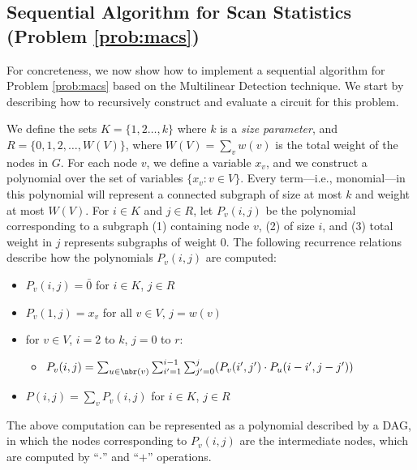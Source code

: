 
\subsection{Sequential Algorithm for Scan Statistics (Problem \ref{prob:macs})}
\label{sec:scan-sequential}

For concreteness, we now show how to implement a sequential algorithm for Problem \ref{prob:macs} based on the Multilinear Detection technique. We start by describing how to recursively construct and evaluate a circuit for this problem.

We define the sets $K=\{1,2 \ldots, k\}$ where $k$ is a \emph{size parameter}, and $R=\{0,1,2, \ldots, W(V)\}$, where $W(V) = \sum_v{w(v)}$ is the total weight of the nodes in $G$. For each node $v$, we define a variable $x_v$, and we construct a polynomial over the set of variables $\{x_v: v \in V\}$. Every term---i.e., monomial---in this polynomial will represent a connected subgraph of size at most $k$ and weight at most $W(V)$.
For $i \in K$ and $j \in R$, let $P_v(i,j)$ be the polynomial corresponding to a subgraph (1) containing node $v$, (2) of size $i$, and (3) total weight in
$j$ represents subgraphs of weight 0.
The following recurrence relations describe how the polynomials $P_v(i, j)$ are computed:
\begin{itemize}
\item
$P_v(i, j) = \bar{0}$ for $i \in K$, $j \in R$
\item
$P_v(1, j) = x_v$ for all $v \in V$, $j = w(v)$
\item
for $v \in V$, $i = 2$ to $k$, $j = 0$ to $r$:
\begin{itemize}
\item
$P_v(i,j) = \sum_{u \in \nbr(v)} \sum_{i' = 1}^{i-1}\sum_{j'=0}^j (P_v(i', j') \cdot P_u(i-i', j - j'))$
\end{itemize}
\item
$P(i,j) = \sum_v P_v(i,j)$ for $i \in K$, $j \in R$
\end{itemize}
The above computation can be represented as a polynomial described by a DAG, in which the
nodes corresponding to $P_v(i, j)$ are the intermediate nodes, which are computed by ``$\cdot$'' and ``$+$''
operations.

